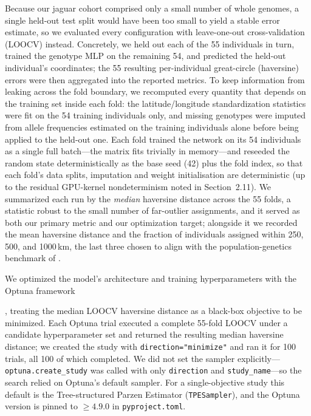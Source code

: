 \documentclass[twocolumn,10pt]{article}
\newcommand{\TODO}[1]{%
  \par\medskip\noindent
  \fcolorbox{red}{yellow!15}{%
    \parbox{0.95\linewidth}{\footnotesize\textbf{\textcolor{red}{[[TODO]]}}\ #1}}%
  \par\medskip}
\begin{document}
Because our jaguar cohort comprised only a small number of whole genomes, a single held-out test
split would have been too small to yield a stable error estimate, so we evaluated every
configuration with leave-one-out cross-validation (LOOCV) instead. Concretely, we held out each of
the 55 individuals in turn, trained the genotype MLP on the remaining 54, and predicted the held-out
individual's coordinates; the 55 resulting per-individual great-circle (haversine) errors were then
aggregated into the reported metrics. To keep information from leaking across the fold boundary, we
recomputed every quantity that depends on the training set inside each fold: the latitude/longitude
standardization statistics were fit on the 54 training individuals only, and missing genotypes were
imputed from allele frequencies estimated on the training individuals alone before being applied to
the held-out one. Each fold trained the network on its 54 individuals as a single full batch---the
matrix fits trivially in memory---and reseeded the random state deterministically as the base seed
(42) plus the fold index, so that each fold's data splits, imputation and weight initialisation are
deterministic (up to the residual GPU-kernel nondeterminism noted in Section~2.11). We summarized
each run by the \emph{median} haversine distance across the 55 folds, a statistic robust to the
small number of far-outlier assignments, and it served as both our primary metric and our
optimization target; alongside it we recorded the mean haversine distance and the fraction of
individuals assigned within 250, 500, and 1000\,km, the last three chosen to align with the
population-genetics benchmark of \citet{lazzari2025development}.

We optimized the model's architecture and training hyperparameters with the Optuna framework
\TODO{need Optuna citation}, treating the
median LOOCV haversine distance as a black-box objective to be minimized. Each Optuna trial executed
a complete 55-fold LOOCV under a candidate hyperparameter set and returned the resulting median
haversine distance; we created the study with \texttt{direction="minimize"} and ran it for 100
trials, all 100 of which completed. We did not set the sampler
explicitly---\texttt{optuna.create\_study} was called with only \texttt{direction} and
\texttt{study\_name}---so the search relied on Optuna's default sampler. For a single-objective
study this default is the Tree-structured Parzen Estimator (\texttt{TPESampler}), and the Optuna
version is pinned to $\geq 4.9.0$ in \texttt{pyproject.toml}.
\end{document}
